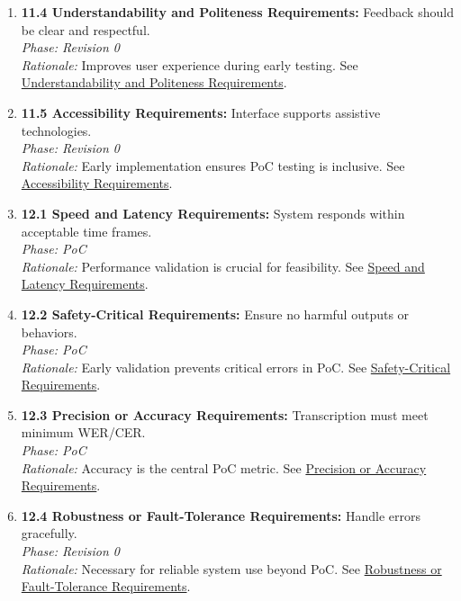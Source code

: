 \documentclass[11pt]{article}
\begin{document}
\begin{enumerate}
    \item \textbf{11.4 Understandability and Politeness Requirements:} Feedback should be clear and respectful.\\
    \textit{Phase: Revision 0} \\
    \textit{Rationale:} Improves user experience during early testing. See \hyperref[subsec:understandability]{Understandability and Politeness Requirements}.


    \item \textbf{11.5 Accessibility Requirements:} Interface supports assistive technologies.\\
    \textit{Phase: Revision 0} \\
    \textit{Rationale:} Early implementation ensures PoC testing is inclusive. See \hyperref[subsec:accessibility]{Accessibility Requirements}.

    \item \textbf{12.1 Speed and Latency Requirements:} System responds within acceptable time frames.\\
    \textit{Phase: PoC} \\
    \textit{Rationale:} Performance validation is crucial for feasibility. See \hyperref[subsec:speed-latency]{Speed and Latency Requirements}.

    \item \textbf{12.2 Safety-Critical Requirements:} Ensure no harmful outputs or behaviors.\\
    \textit{Phase: PoC} \\
    \textit{Rationale:} Early validation prevents critical errors in PoC. See \hyperref[subsec:safety]{Safety-Critical Requirements}.

    \item \textbf{12.3 Precision or Accuracy Requirements:} Transcription must meet minimum WER/CER.\\
    \textit{Phase: PoC} \\
    \textit{Rationale:} Accuracy is the central PoC metric. See \hyperref[subsec:accuracy]{Precision or Accuracy Requirements}.

    \item \textbf{12.4 Robustness or Fault-Tolerance Requirements:} Handle errors gracefully.\\
    \textit{Phase: Revision 0} \\
    \textit{Rationale:} Necessary for reliable system use beyond PoC. See \hyperref[subsec:robustness]{Robustness or Fault-Tolerance Requirements}.


\end{enumerate}
\end{document}
